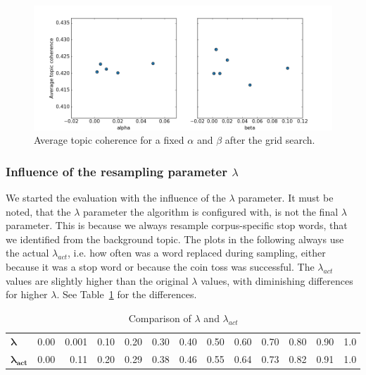 \documentclass[
        a4paper,
        titlepage,
        twoside,
        parskip
        ]{scrbook}
\newcommand{\ra}[1]{\renewcommand{\arraystretch}{#1}}
\theoremstyle{break}
\begin{document}
\begin{figure}
       \centering
       \includegraphics[width=\textwidth]{figures/standard_lda_alpha_beta.png}
       \caption{Average topic coherence for a fixed $\alpha$ and $\beta$ after the grid search.}
       \label{fig:standard_lda_alpha_beta}
\end{figure}

\subsubsection{Influence of the resampling parameter $\lambda$}
We started the evaluation with the influence of the $\lambda$ parameter.
It must be noted, that the $\lambda$ parameter the algorithm is configured with, is not the final $\lambda$ parameter.
This is because we always resample corpus-specific stop words, that we identified from the background topic.
The plots in the following always use the actual $\lambda_{act}$, i.e. how often was a word replaced during sampling, either because it was a stop word or because the coin toss was successful.
The $\lambda_{act}$ values are slightly higher than the original $\lambda$ values, with diminishing differences for higher $\lambda$. See Table~\ref{table:actual_lambda} for the differences.
\begin{table}[]
  \ra{1.2}
  \centering
  \caption{Comparison of $\lambda$ and $\lambda_{act}$}
  \label{table:actual_lambda}
  \begin{tabular}{lrrrrrrrrrrrr}
    \toprule
    $\boldsymbol{\lambda}$     & 0.00 & 0.001 & 0.10  & 0.20  & 0.30  & 0.40  & 0.50  & 0.60  & 0.70  & 0.80  & 0.90  & 1.0 \\
    $\boldsymbol{\lambda_{act}}$ & 0.00 & 0.11  & 0.20 & 0.29 & 0.38 & 0.46 & 0.55 & 0.64 & 0.73 & 0.82 & 0.91 & 1.0 \\
    \bottomrule
  \end{tabular}
\end{table}
\end{document}
